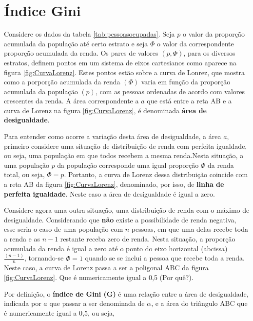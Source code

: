 \documentclass[
]{book}
\begin{document}
\hypertarget{uxedndice-gini}{%
\section{Índice Gini}\label{uxedndice-gini}}

Considere os dados da tabela \ref{tab:pessoasocupadas}. Seja \(p\) o valor da proporção acumulada da população até certo estrato e seja \(\Phi\) o valor da correspondente proporção acumulada da renda. Os pares de valores \((p,\Phi)\), para os diversos estratos, definem pontos em um sistema de eixos cartesianos como aparece na figura \ref{fig:CurvaLorenz}. Estes pontos estão sobre a curva de Lonrez, que mostra como a porporção acumulada da renda \((\Phi)\) varia em função da proporção acumulada da população \((p)\), com as pessoas ordenadas de acordo com valores crescentes da renda. A área correspondente a \(a\) que está entre a reta AB e a curva de Lorenz na figura \ref{fig:CurvaLorenz}, é denominada \textbf{área de desigualdade}.

Para entender como ocorre a variação desta área de desigualdade, a área \(a\), primeiro considere uma situação de distribuição de renda com perfeita igualdade, ou seja, uma população em que todos recebem a mesma renda.Nesta situação, a uma população \(p\) da população corresponde uma igual proporção \(\Phi\) da renda total, ou seja, \(\Phi = p\). Portanto, a curva de Lorenz dessa distribuição coincide com a reta AB da figura \ref{fig:CurvaLorenz}, denominado, por isso, de \textbf{linha de perfeita igualdade}. Neste caso a área de desigualdade é igual a zero.

Considere agora uma outra situação, uma distribuição de renda com o máximo de desigualdade. Considerando que \textbf{não} existe a possibilidade de renda negativa, esse seria o caso de uma população com \(n\) pessoas, em que uma delas recebe toda a renda e as \(n-1\) restante receba zero de renda. Nesta situação, a proporção acumulada da renda é igual a zero até o ponto do eixo horizontal (abcissa) \(\frac{(n-1)}{n}\), tornando-se \(\Phi = 1\) quando se se inclui a pessoa que recebe toda a renda. Neste caso, a curva de Lorenz passa a ser a poligonal ABC da figura \ref{fig:CurvaLorenz}. Que é numericamente igual a 0,5 (Por quê?).

Por definição, o \textbf{índice de Gini (G)} é uma relação entre a área de desigualdade, indicada por \(a\) que passar a ser denominada de \(\alpha\), e a área do triângulo ABC que é numericamente igual a 0,5, ou seja,
\end{document}
